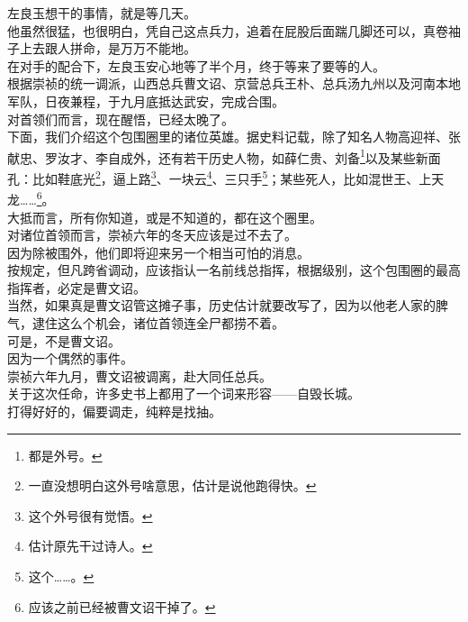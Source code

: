 \begin{multicols}{\theparacolNo}
左良玉想干的事情，就是等几天。\\

他虽然很猛，也很明白，凭自己这点兵力，追着在屁股后面踹几脚还可以，真卷袖子上去跟人拼命，是万万不能地。\\

在对手的配合下，左良玉安心地等了半个月，终于等来了要等的人。\\

根据崇祯的统一调派，山西总兵曹文诏、京营总兵王朴、总兵汤九州以及河南本地军队，日夜兼程，于九月底抵达武安，完成合围。\\

对首领们而言，现在醒悟，已经太晚了。\\

下面，我们介绍这个包围圈里的诸位英雄。据史料记载，除了知名人物高迎祥、张献忠、罗汝才、李自成外，还有若干历史人物，如薛仁贵、刘备\footnote{都是外号。}以及某些新面孔：比如鞋底光\footnote{一直没想明白这外号啥意思，估计是说他跑得快。}，逼上路\footnote{这个外号很有觉悟。}、一块云\footnote{估计原先干过诗人。}、三只手\footnote{这个……。}；某些死人，比如混世王、上天龙……\footnote{应该之前已经被曹文诏干掉了。}。\\

大抵而言，所有你知道，或是不知道的，都在这个圈里。\\

对诸位首领而言，崇祯六年的冬天应该是过不去了。\\

因为除被围外，他们即将迎来另一个相当可怕的消息。\\

按规定，但凡跨省调动，应该指认一名前线总指挥，根据级别，这个包围圈的最高指挥者，必定是曹文诏。\\

当然，如果真是曹文诏管这摊子事，历史估计就要改写了，因为以他老人家的脾气，逮住这么个机会，诸位首领连全尸都捞不着。\\

可是，不是曹文诏。\\

因为一个偶然的事件。\\

崇祯六年九月，曹文诏被调离，赴大同任总兵。\\

关于这次任命，许多史书上都用了一个词来形容——自毁长城。\\

打得好好的，偏要调走，纯粹是找抽。\\


\end{multicols}
